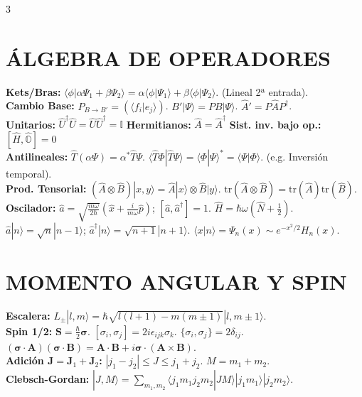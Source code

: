 \documentclass[8pt,a4paper,fleqn]{extarticle} %
\begin{document}
\begin{multicols}{3}
\section{ÁLGEBRA DE OPERADORES}
\textbf{Kets/Bras:} $\langle \phi | \alpha \Psi_1 + \beta \Psi_2 \rangle = \alpha \langle \phi | \Psi_1 \rangle + \beta \langle \phi | \Psi_2 \rangle$. (Lineal 2ª entrada).\\
\textbf{Cambio Base:} $P_{B \to B'} = (\langle f_i | e_j \rangle)$. $B'|\Psi\rangle = P B|\Psi\rangle$. $\hat{A}' = P \hat{A} P^\dagger$.\\
\textbf{Unitarios:} $\hat{U}^\dagger\hat{U} = \hat{U}\hat{U}^\dagger = \mathbb{I}$ \quad \textbf{Hermitianos:} $\hat{A} = \hat{A}^\dagger$
\quad \textbf{Sist. inv. bajo op.: } $[\hat{H}, \hat{\mathbb{O}}] = 0$
\\
\textbf{Antilineales:} $\hat{T}(\alpha\Psi) = \alpha^*\hat{T}\Psi$. $\langle \hat{T}\Phi | \hat{T}\Psi \rangle = \langle \Phi | \Psi \rangle^* = \langle \Psi | \Phi \rangle$. (e.g. Inversión temporal).\\
\textbf{Prod. Tensorial:} $(\hat{A} \otimes \hat{B})|x,y\rangle = \hat{A}|x\rangle \otimes \hat{B}|y\rangle$. $\text{tr}(\hat{A}\otimes\hat{B}) = \text{tr}(\hat{A})\text{tr}(\hat{B})$.\\
\textbf{Oscilador:} $\hat{a} = \sqrt{\frac{m\omega}{2\hbar}}(\hat{x} + \frac{i}{m\omega}\hat{p})$; $[\hat{a}, \hat{a}^\dagger] = 1$. $\hat{H} = \hbar\omega(\hat{N} + \frac{1}{2})$.\\
$\hat{a}|n\rangle = \sqrt{n}|n-1\rangle$; $\hat{a}^\dagger|n\rangle = \sqrt{n+1}|n+1\rangle$. $\langle x | n \rangle = \Psi_n(x) \sim e^{-x^2/2} H_n(x)$.
\section{MOMENTO ANGULAR Y SPIN}
\textbf{Escalera:} $L_\pm |l,m\rangle = \hbar \sqrt{l(l+1)-m(m\pm 1)} |l,m\pm 1\rangle$.\\
\textbf{Spin 1/2:} $\mathbf{S} = \frac{\hbar}{2} \bm{\sigma}$. $[\sigma_i, \sigma_j] = 2i \epsilon_{ijk} \sigma_k$. $\{\sigma_i, \sigma_j\} = 2\delta_{ij}$.\\
$(\bm{\sigma}\cdot\mathbf{A})(\bm{\sigma}\cdot\mathbf{B}) = \mathbf{A}\cdot\mathbf{B} + i\bm{\sigma}\cdot(\mathbf{A}\times\mathbf{B})$.\\
\textbf{Adición $\mathbf{J} = \mathbf{J}_1 + \mathbf{J}_2$:} $|j_1-j_2| \le J \le j_1+j_2$. $M = m_1+m_2$.\\
\textbf{Clebsch-Gordan:} $|J,M\rangle = \sum_{m_1,m_2} \langle j_1 m_1 j_2 m_2 | J M \rangle |j_1 m_1\rangle |j_2 m_2\rangle$.

\end{multicols}
\end{document}
